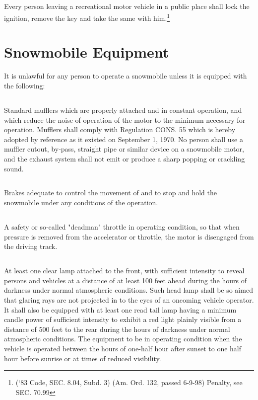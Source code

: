 \subsection{}
Every person leaving a recreational motor vehicle in a public place shall lock the ignition, remove the key and take the same with him.\footnote{(‘83 Code, SEC. 8.04, Subd. 3) (Am. Ord. 132, passed 6-9-98) Penalty, see SEC. 70.99}
\section{Snowmobile Equipment}
It is unlawful for any person to operate a snowmobile unless it is equipped with the following:
\subsection{}
Standard mufflers which are properly attached and in constant operation, and which reduce the noise of operation of the motor to the minimum necessary for operation. Mufflers shall comply with Regulation CONS. 55 which is hereby adopted by reference as it existed on September 1, 1970. No person shall use a muffler cut­out, by‑pass, straight pipe or similar device on a snowmobile motor, and the exhaust system shall not emit or produce a sharp popping or crackling sound.
\subsection{}
Brakes adequate to control the movement of and to stop and hold the snowmobile under any conditions of the operation.
\subsection{}
A safety or so‑called "deadman" throttle in operating condition, so that when pressure is removed from the accelerator or throttle, the motor is disengaged from the driving track.
\subsection{}
At least one clear lamp attached to the front, with sufficient intensity to reveal persons and vehicles at a distance of at least 100 feet ahead during the hours of darkness under normal atmospheric conditions. Such head lamp shall be so aimed that glaring rays are not projected in to the eyes of an oncoming vehicle operator. It shall also be equipped with at least one read tail lamp having a minimum candle power of sufficient intensity to exhibit a red light plainly visible from a distance of 500 feet to the rear during the hours of darkness under normal atmospheric conditions. The equipment to be in operating condition when the vehicle is operated between the hours of one-half hour after sunset to one half hour before sunrise or at times of reduced visibility.
